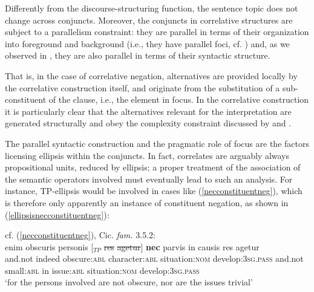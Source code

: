 \documentclass[output=paper,modfonts,nonflat,citecolor=brown,
showindex
]{langsci/langscibook}
\begin{document}
\noindent Differently from the discourse-structuring function, the sentence topic does not change across conjuncts. Moreover, the conjuncts in correlative structures are subject to a parallelism constraint: they are parallel in terms of their organization into foreground and background (i.e., they have parallel foci, cf. \citealt[64]{Koenig91}) and, as we observed in , they are also parallel in terms of their syntactic structure.

That is, in the case of correlative negation, alternatives are provided locally by the correlative construction itself, and originate from the substitution of a sub-constituent of the clause, i.e., the element in focus. In the correlative construction it is particularly clear that the alternatives relevant for the interpretation are generated structurally and obey the complexity constraint discussed by \citet{Katzir07} and \citet{FoxKatzir11}.

The parallel syntactic construction and the pragmatic role of focus are the factors licensing ellipsis within the conjuncts. In fact, correlates are arguably always propositional units, reduced by ellipsis; a proper treatment of the association of the semantic operators involved must eventually lead to such an analysis. For instance, TP-ellipsis would be involved in cases like (\ref{necconstituentneg}), which is therefore only apparently an instance of constituent negation, as shown in (\ref{ellipsisnecconstituentneg}):

{\begin{exe}
\ex \label{ellipsisnecconstituentneg} cf. (\ref{necconstituentneg}), Cic. {\emph{fam.}} 3.5.2:\\
 enim obscuris personis [$_{TP}$ \sout{res} \sout{agetur}] {\textbf{nec}} parvis in causis res agetur\\
and.not indeed obscure:{\textsc{abl}} character:{\textsc{abl}} {} situation:{\textsc{nom}} develop:{\textsc{3sg.pass}} and.not small:{\textsc{abl}} in issue:{\textsc{abl}} situation:{\textsc{nom}} develop:{\textsc{3sg.pass}}\\
\glt `for the persons involved are not obscure, nor are the issues trivial'
\end{exe}}
\end{document}
